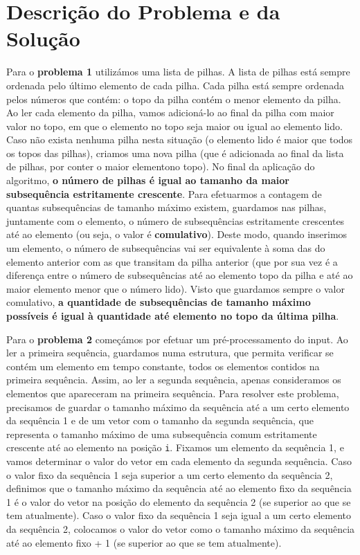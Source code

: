 \documentclass[12pt,a4paper]{article}
\begin{document}
  \section{Descrição do Problema e da Solução}

  Para o \textbf{problema 1} utilizámos uma lista de pilhas.
  A lista de pilhas está sempre ordenada pelo último elemento de cada pilha.
  Cada pilha está sempre ordenada pelos números que contém: o topo da pilha contém o menor elemento da pilha.
  Ao ler cada elemento da pilha, vamos adicioná-lo ao final da pilha com maior valor no topo, em que o elemento no topo seja maior ou igual ao elemento lido.
  Caso não exista nenhuma pilha nesta situação (o elemento lido é maior que todos os topos das pilhas), criamos uma nova pilha (que é adicionada ao final da lista de pilhas, por conter o maior elementono topo).
  No final da aplicação do algoritmo, \textbf{o número de pilhas é igual ao tamanho da maior subsequência estritamente crescente}.
  Para efetuarmos a contagem de quantas subsequências de tamanho máximo existem, guardamos nas pilhas, juntamente com o elemento, o número de subsequências estritamente crescentes até ao elemento (ou seja, o valor é \textbf{comulativo}).
  Deste modo, quando inserimos um elemento, o número de subsequências vai ser equivalente à soma das do elemento anterior com as que transitam da pilha anterior (que por sua vez é a diferença entre o número de subsequências até ao elemento topo da pilha e até ao maior elemento menor que o número lido).
  Visto que guardamos sempre o valor comulativo, \textbf{a quantidade de subsequências de tamanho máximo possíveis é igual à quantidade até elemento no topo da última pilha}.

  Para o \textbf{problema 2} começámos por efetuar um pré-processamento do input.
  Ao ler a primeira sequência, guardamos numa estrutura, que permita verificar se contém um elemento em tempo constante, todos os elementos contidos na primeira sequência.
  Assim, ao ler a segunda sequência, apenas consideramos os elementos que apareceram na primeira sequência.
  Para resolver este problema, precisamos de guardar o tamanho máximo da sequência até a um certo elemento da sequência 1 e de um vetor com o tamanho da segunda sequência, que representa o tamanho máximo de uma subsequência comum estritamente crescente até ao elemento na posição \texttt{i}.
  Fixamos um elemento da sequência 1, e vamos determinar o valor do vetor em cada elemento da segunda sequência.
  Caso o valor fixo da sequência 1 seja superior a um certo elemento da sequência 2, definimos que o tamanho máximo da sequência até ao elemento fixo da sequência 1 é o valor do vetor na posição do elemento da sequência 2 (se superior ao que se tem atualmente).
  Caso o valor fixo da sequência 1 seja igual a um certo elemento da sequência 2, colocamos o valor do vetor como o tamanho máximo da sequência até ao elemento fixo + 1 (se superior ao que se tem atualmente).
\end{document}
